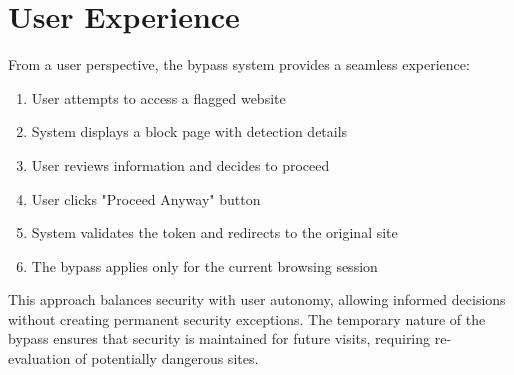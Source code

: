 \section{User Experience}

From a user perspective, the bypass system provides a seamless experience:

\begin{enumerate}
    \item User attempts to access a flagged website
    \item System displays a block page with detection details
    \item User reviews information and decides to proceed
    \item User clicks "Proceed Anyway" button
    \item System validates the token and redirects to the original site
    \item The bypass applies only for the current browsing session
\end{enumerate}

This approach balances security with user autonomy, allowing informed decisions without creating permanent security exceptions. The temporary nature of the bypass ensures that security is maintained for future visits, requiring re-evaluation of potentially dangerous sites.
